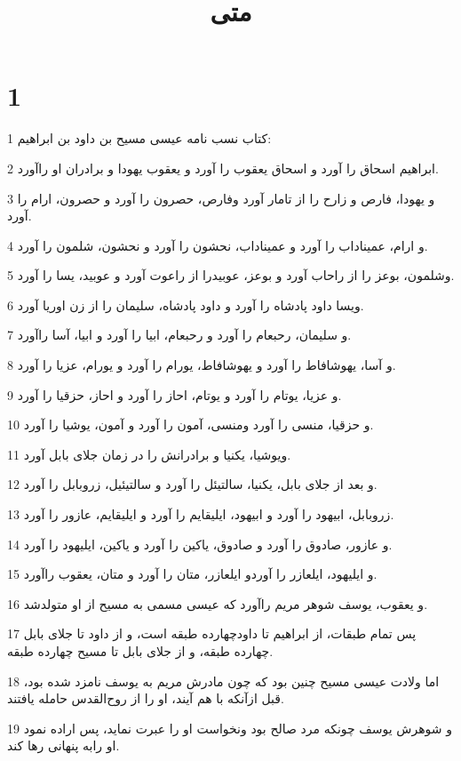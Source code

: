 

\title{متی}


\chapter{1}

\par 1 کتاب نسب نامه عیسی مسیح بن داود بن ابراهیم:
\par 2 ابراهیم اسحاق را آورد و اسحاق یعقوب را آورد و یعقوب یهودا و برادران او راآورد.
\par 3 و یهودا، فارص و زارح را از تامار آورد وفارص، حصرون را آورد و حصرون، ارام را آورد.
\par 4 و ارام، عمیناداب را آورد و عمیناداب، نحشون را آورد و نحشون، شلمون را آورد.
\par 5 وشلمون، بوعز را از راحاب آورد و بوعز، عوبیدرا از راعوت آورد و عوبید، یسا را آورد.
\par 6 ویسا داود پادشاه را آورد و داود پادشاه، سلیمان را از زن اوریا آورد.
\par 7 و سلیمان، رحبعام را آورد و رحبعام، ابیا را آورد و ابیا، آسا راآورد.
\par 8 و آسا، یهوشافاط را آورد و یهوشافاط، یورام را آورد و یورام، عزیا را آورد.
\par 9 و عزیا، یوتام را آورد و یوتام، احاز را آورد و احاز، حزقیا را آورد.
\par 10 و حزقیا، منسی را آورد ومنسی، آمون را آورد و آمون، یوشیا را آورد.
\par 11 ویوشیا، یکنیا و برادرانش را در زمان جلای بابل آورد.
\par 12 و بعد از جلای بابل، یکنیا، سالتیئل را آورد و سالتیئیل، زروبابل را آورد.
\par 13 زروبابل، ابیهود را آورد و ابیهود، ایلیقایم را آورد و ایلیقایم، عازور را آورد.
\par 14 و عازور، صادوق را آورد و صادوق، یاکین را آورد و یاکین، ایلیهود را آورد.
\par 15 و ایلیهود، ایلعازر را آوردو ایلعازر، متان را آورد و متان، یعقوب راآورد.
\par 16 و یعقوب، یوسف شوهر مریم راآورد که عیسی مسمی به مسیح از او متولدشد.
\par 17 پس تمام طبقات، از ابراهیم تا داودچهارده طبقه است، و از داود تا جلای بابل چهارده طبقه، و از جلای بابل تا مسیح چهارده طبقه.
\par 18 اما ولادت عیسی مسیح چنین بود که چون مادرش مریم به یوسف نامزد شده بود، قبل ازآنکه با هم آیند، او را از روح‌القدس حامله یافتند.
\par 19 و شوهرش یوسف چونکه مرد صالح بود ونخواست او را عبرت نماید، پس اراده نمود او رابه پنهانی رها کند.
